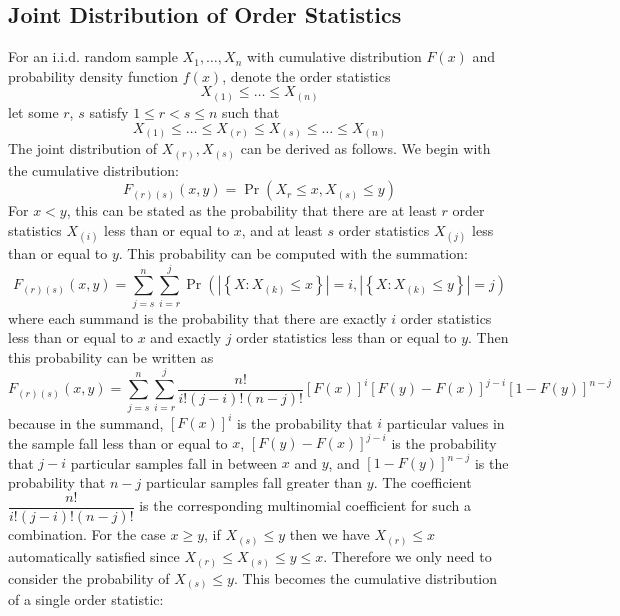 \documentclass[11pt]{report} %
\begin{document}
\subsection{Joint Distribution of Order Statistics}

For an i.i.d. random sample $X_{1}, \dots, X_{n}$ with cumulative distribution $F\left(x\right)$ and probability density function $f\left(x\right)$, denote the order statistics
\begin{equation}
X_{\left(1\right)} \leq \dots \leq X_{\left(n\right)}
\end{equation}
let some $r$, $s$ satisfy $1 \leq r < s \leq n$ such that
\begin{equation}
X_{\left(1\right)} \leq \dots \leq X_{\left(r\right)} \leq X_{\left(s\right)} \leq \dots \leq X_{\left(n\right)}
\end{equation}
The joint distribution of $X_{\left(r\right)}, X_{\left(s\right)}$ can be derived as follows. We begin with the cumulative distribution:
\begin{equation}
F_{\left(r\right)\left(s\right)}\left(x, y\right) = \operatorname{Pr}\left(X_{r} \leq x, X_{\left(s\right)} \leq y\right)
\end{equation}
For $x < y$, this can be stated as the probability that there are at least $r$ order statistics $X_{\left(i\right)}$ less than or equal to $x$, and at least $s$ order statistics $X_{\left(j\right)}$ less than or equal to $y$. This probability can be computed with the summation:
\begin{equation}
F_{\left(r\right)\left(s\right)}\left(x, y\right) = \sum_{j = s}^{n}\sum_{i = r}^{j}\operatorname{Pr}\left(\left|\left\{X: X_{\left(k\right)} \leq x\right\}\right| = i, \left|\left\{X: X_{\left(k\right)} \leq y\right\}\right| = j\right)
\end{equation}
where each summand is the probability that there are exactly $i$ order statistics less than or equal to $x$ and exactly $j$ order statistics less than or equal to $y$. Then this probability can be written as
\begin{equation}
F_{\left(r\right)\left(s\right)}\left(x, y\right) = \sum_{j = s}^{n}\sum_{i = r}^{j}\dfrac{n!}{i!\left(j - i\right)!\left(n - j\right)!}\left[F\left(x\right)\right]^{i}\left[F\left(y\right) - F\left(x\right)\right]^{j - i}\left[1 - F\left(y\right)\right]^{n - j}
\end{equation}
because in the summand, $\left[F\left(x\right)\right]^{i}$ is the probability that $i$ particular values in the sample fall less than or equal to $x$, $\left[F\left(y\right) - F\left(x\right)\right]^{j - i}$ is the probability that $j - i$ particular samples fall in between $x$ and $y$, and $\left[1 - F\left(y\right)\right]^{n - j}$ is the probability that $n - j$ particular samples fall greater than $y$. The coefficient $\dfrac{n!}{i!\left(j - i\right)!\left(n - j\right)!}$ is the corresponding multinomial coefficient for such a combination. For the case $x \geq y$, if $X_{\left(s\right)} \leq y$ then we have $X_{\left(r\right)} \leq x$ automatically satisfied since $X_{\left(r\right)} \leq X_{\left(s\right)} \leq y \leq x$. Therefore we only need to consider the probability of $X_{\left(s\right)} \leq y$. This becomes the cumulative distribution of a single order statistic:
\end{document}
